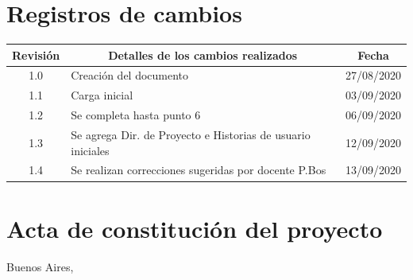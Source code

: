 \documentclass[11pt]{charter}
\begin{document}
\maketitle
\thispagestyle{empty}
\pagebreak


\thispagestyle{empty}
{\setlength{\parskip}{0pt}
\tableofcontents{}
}
\pagebreak


\section{Registros de cambios}
\label{sec:registro}


\begin{table}[ht]
\label{tab:registro}
\centering
\begin{tabularx}{\linewidth}{@{}|c|X|c|@{}}
\hline
\rowcolor[HTML]{C0C0C0} 
Revisión & \multicolumn{1}{c|}{\cellcolor[HTML]{C0C0C0}Detalles de los cambios realizados} & Fecha      \\ \hline
1.0      & Creación del documento                                          & 27/08/2020 \\ \hline
1.1      & Carga inicial                                                   & 03/09/2020 \\ \hline
1.2      & Se completa hasta punto 6									   & 06/09/2020 \\ \hline
1.3      & Se agrega Dir. de Proyecto e Historias de usuario iniciales	   & 12/09/2020 \\ \hline
1.4      & Se realizan correcciones sugeridas por docente P.Bos			   & 13/09/2020 \\ \hline
\end{tabularx}
\end{table}

\pagebreak



\section{Acta de constitución del proyecto}
\label{sec:acta}

\begin{flushright}
Buenos Aires, \fechaInicioName
\end{flushright}
\end{document}
